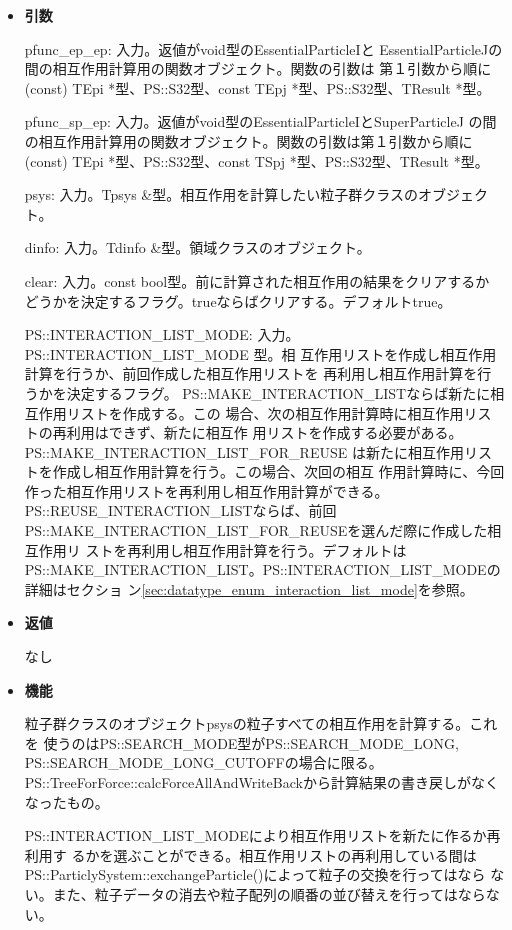 \begin{itemize}

\item {\bf 引数}

pfunc\_ep\_ep: 入力。返値がvoid型のEssentialParticleIと
EssentialParticleJの間の相互作用計算用の関数オブジェクト。関数の引数は
第１引数から順に(const) TEpi *型、PS::S32型、const
TEpj *型、PS::S32型、TResult *型。

pfunc\_sp\_ep: 入力。返値がvoid型のEssentialParticleIとSuperParticleJ
の間の相互作用計算用の関数オブジェクト。関数の引数は第１引数から順に
(const) TEpi *型、PS::S32型、const TSpj *型、PS::S32型、TResult *型。

psys: 入力。Tpsys \&型。相互作用を計算したい粒子群クラスのオブジェクト。

dinfo: 入力。Tdinfo \&型。領域クラスのオブジェクト。

clear: 入力。const bool型。前に計算された相互作用の結果をクリアするか
どうかを決定するフラグ。trueならばクリアする。デフォルトtrue。

PS::INTERACTION\_LIST\_MODE: 入力。PS::INTERACTION\_LIST\_MODE 型。相
互作用リストを作成し相互作用計算を行うか、前回作成した相互作用リストを
再利用し相互作用計算を行うかを決定するフラグ。
PS::MAKE\_INTERACTION\_LISTならば新たに相互作用リストを作成する。この
場合、次の相互作用計算時に相互作用リストの再利用はできず、新たに相互作
用リストを作成する必要がある。PS::MAKE\_INTERACTION\_LIST\_FOR\_REUSE
は新たに相互作用リストを作成し相互作用計算を行う。この場合、次回の相互
作用計算時に、今回作った相互作用リストを再利用し相互作用計算ができる。
PS::REUSE\_INTERACTION\_LISTならば、前回
PS::MAKE\_INTERACTION\_LIST\_FOR\_REUSEを選んだ際に作成した相互作用リ
ストを再利用し相互作用計算を行う。デフォルトは
PS::MAKE\_INTERACTION\_LIST。PS::INTERACTION\_LIST\_MODEの詳細はセクショ
ン\ref{sec:datatype_enum_interaction_list_mode}を参照。

\item {\bf 返値}

なし

\item {\bf 機能}

粒子群クラスのオブジェクトpsysの粒子すべての相互作用を計算する。これを
使うのはPS::SEARCH\_MODE型がPS::SEARCH\_MODE\_LONG,
PS::SEARCH\_MODE\_LONG\_CUTOFFの場合に限る。
PS::TreeForForce::calcForceAllAndWriteBackから計算結果の書き戻しがなく
なったもの。

PS::INTERACTION\_LIST\_MODEにより相互作用リストを新たに作るか再利用す
るかを選ぶことができる。相互作用リストの再利用している間は
PS::ParticlySystem::exchangeParticle()によって粒子の交換を行ってはなら
ない。また、粒子データの消去や粒子配列の順番の並び替えを行ってはならな
い。

\end{itemize}

